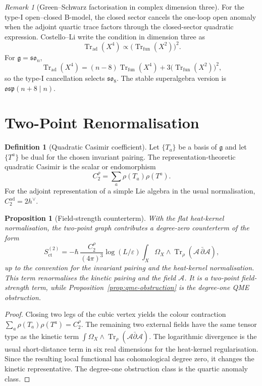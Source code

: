 \documentclass[11pt]{amsart}
\providecommand{\dbar}{\bar{\partial}}
\providecommand{\gfrak}{\mathfrak{g}}
\providecommand{\Tr}{\operatorname{Tr}}
\providecommand{\ad}{\operatorname{ad}}
\providecommand{\cA}{\mathcal{A}}
\theoremstyle{plain}
\newtheorem{proposition}[theorem]{Proposition}
\theoremstyle{definition}
\newtheorem{definition}[theorem]{Definition}
\theoremstyle{remark}
\newtheorem{remark}[theorem]{Remark}
\begin{document}
\begin{remark}[Green--Schwarz factorisation in complex dimension three]
\label{rem:gs-factorisation}
For the type-I open--closed B-model, the closed sector cancels the
one-loop open anomaly when the adjoint quartic trace factors through the
closed-sector quadratic expression. Costello--Li write the condition in
dimension three as
\[
  \Tr_{\ad}(X^4)\propto \bigl(\Tr_{\mathrm{fun}}(X^2)\bigr)^2 .
\]
For $\gfrak=\mathfrak{so}_n$,
\[
  \Tr_{\ad}(X^4)
  =(n-8)\Tr_{\mathrm{fun}}(X^4)
  +3\bigl(\Tr_{\mathrm{fun}}(X^2)\bigr)^2,
\]
so the type-I cancellation selects $\mathfrak{so}_8$. The stable
superalgebra version is $\mathfrak{osp}(n+8\mid n)$.
\end{remark}

\section{Two-Point Renormalisation}
\label{sec:two-point}

\begin{definition}[Quadratic Casimir coefficient]
\label{def:quadratic-casimir}
Let $\{T_a\}$ be a basis of $\gfrak$ and let $\{T^a\}$ be dual for the
chosen invariant pairing. The representation-theoretic quadratic
Casimir is the scalar or endomorphism
\[
  C_2^\rho=\sum_a\rho(T_a)\rho(T^a).
\]
For the adjoint representation of a simple Lie algebra in the usual
normalisation, $C_2^{\ad}=2h^\vee$.
\end{definition}

\begin{proposition}[Field-strength counterterm]
\label{prop:field-strength}
With the flat heat-kernel normalisation, the two-point graph contributes
a degree-zero counterterm of the form
\[
  S_{\mathrm{ct}}^{(2)}
  =
  -\hbar\,\frac{C_2^\rho}{(4\pi)^3}
  \log(L/\varepsilon)
  \int_X\Omega_X\wedge\Tr_\rho(\cA\,\dbar\cA),
\]
up to the convention for the invariant pairing and the heat-kernel
normalisation. This term renormalises the kinetic pairing and the field
$\cA$. It is a two-point field-strength term, while
Proposition~\ref{prop:qme-obstruction} is the degree-one QME
obstruction.
\end{proposition}

\begin{proof}
Closing two legs of the cubic vertex yields the colour contraction
$\sum_a\rho(T_a)\rho(T^a)=C_2^\rho$. The remaining two external fields
have the same tensor type as the kinetic term
$\int\Omega_X\wedge\Tr_\rho(\cA\dbar\cA)$. The logarithmic divergence is
the usual short-distance term in six real dimensions for the heat-kernel
regularisation. Since the resulting local functional has cohomological
degree zero, it changes the kinetic representative. The degree-one
obstruction class is the quartic anomaly class.
\end{proof}
\end{document}
